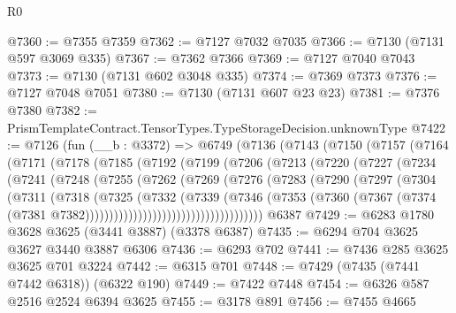 \begin{lexlean}{R0}
\begin{coremodule}
@7360 := @7355 @7359
@7362 := @7127 @7032 @7035
@7366 := @7130 (@7131 @597 @3069 @335)
@7367 := @7362 @7366
@7369 := @7127 @7040 @7043
@7373 := @7130 (@7131 @602 @3048 @335)
@7374 := @7369 @7373
@7376 := @7127 @7048 @7051
@7380 := @7130 (@7131 @607 @23 @23)
@7381 := @7376 @7380
@7382 := PrismTemplateContract.TensorTypes.TypeStorageDecision.unknownType
@7422 := @7126
    (fun (__b : @3372) =>
    @6749
      (@7136
        (@7143
          (@7150
            (@7157
              (@7164
                (@7171
                  (@7178
                    (@7185
                      (@7192
                        (@7199
                          (@7206
                            (@7213
                              (@7220
                                (@7227
                                  (@7234
                                    (@7241
                                      (@7248
                                        (@7255
                                          (@7262
                                            (@7269
                                              (@7276
                                                (@7283
                                                  (@7290
                                                    (@7297
                                                      (@7304
                                                        (@7311
                                                          (@7318
                                                            (@7325
                                                              (@7332
                                                                (@7339
                                                                  (@7346
                                                                    (@7353
                                                                      (@7360
                                                                        (@7367
                                                                          (@7374
                                                                            (@7381
                                                                              @7382)))))))))))))))))))))))))))))))))))))
    @6387
@7429 := @6283 @1780 @3628 @3625 (@3441 @3887) (@3378 @6387)
@7435 := @6294 @704 @3625 @3627 @3440 @3887 @6306
@7436 := @6293 @702
@7441 := @7436 @285 @3625 @3625 @701 @3224
@7442 := @6315 @701
@7448 := @7429 (@7435 (@7441 @7442 @6318)) (@6322 @190)
@7449 := @7422 @7448
@7454 := @6326 @587 @2516 @2524 @6394 @3625
@7455 := @3178 @891
@7456 := @7455 @4665

\end{coremodule}
\end{lexlean}
